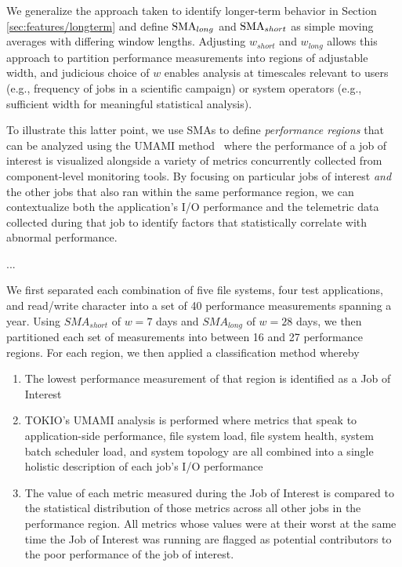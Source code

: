 We generalize the approach taken to identify longer-term behavior in Section \ref{sec:features/longterm} and define $\textup{SMA}_{long}$ and $\textup{SMA}_{short}$ as simple moving averages with differing window lengths.
Adjusting $w_{short}$ and $w_{long}$ allows this approach to partition performance measurements into regions of adjustable width, and judicious choice of $w$ enables analysis at timescales relevant to users (e.g., frequency of jobs in a scientific campaign) or system operators (e.g., sufficient width for meaningful statistical analysis).

To illustrate this latter point, we use SMAs to define \emph{performance regions} that can be analyzed using the UMAMI method~\cite{Lockwood2017} where the performance of a job of interest is visualized alongside a variety of metrics concurrently collected from component-level monitoring tools.
By focusing on particular jobs of interest \emph{and} the other jobs that also ran within the same performance region, we can contextualize both the application's I/O performance and the telemetric data collected during that job to identify factors that statistically correlate with abnormal performance.

...

We first separated each combination of five file systems, four test applications, and read/write character into a set of 40 performance measurements spanning a year.
Using $SMA_{short}$ of $w = 7$ days and $SMA_{long}$ of $w = 28$ days, we then partitioned each set of measurements into between 16 and 27 performance regions.
For each region, we then applied a classification method whereby

\begin{enumerate}
\item The lowest performance measurement of that region is identified as a Job of Interest
\item TOKIO's UMAMI analysis is performed where metrics that speak to application-side performance, file system load, file system health, system batch scheduler load, and system topology are all combined into a single holistic description of each job's I/O performance
\item The value of each metric measured during the Job of Interest is compared to the statistical distribution of those metrics across all other jobs in the performance region.  All metrics whose values were at their worst at the same time the Job of Interest was running are flagged as potential contributors to the poor performance of the job of interest.
\end{enumerate}

